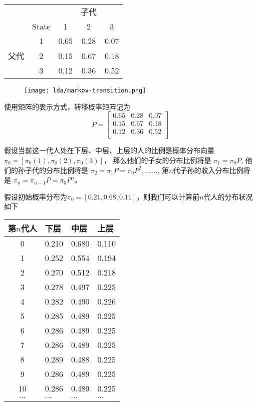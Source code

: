 \begin{center}
\begin{tabular}{ccccc}
\hline
& & & 子代 &  \\
& State & 1 & 2 & 3 \\
\hline
     &1 & 0.65 & 0.28 & 0.07 \\
父代 & 2 & 0.15 & 0.67 & 0.18 \\
     & 3 & 0.12 & 0.36 & 0.52 \\
\end{tabular}
\end{center}

\begin{figure}[htbp]
\centering
\texttt{[image: lda/markov-transition.png]}
\end{figure}

使用矩阵的表示方式，转移概率矩阵记为
$$P =
\begin{bmatrix}
0.65 & 0.28 & 0.07 \\
0.15 & 0.67 & 0.18 \\
0.12 & 0.36 & 0.52 \\
\end{bmatrix}
$$

假设当前这一代人处在下层、中层、上层的人的比例是概率分布向量 $\pi_0=[\pi_0(1), \pi_0(2), \pi_0(3)]$，
那么他们的子女的分布比例将是 $\pi_1=\pi_0P$, 他们的孙子代的分布比例将是 $\pi_2 = \pi_1P=\pi_0P^2$,
......, 第$n$代子孙的收入分布比例将是 $\pi_n = \pi_{n-1}P = \pi_0P^n$。

假设初始概率分布为$\pi_0 = [0.21,0.68,0.11] $，则我们可以计算前$n$代人的分布状况如下
\begin{center}
\begin{tabular}{clll}
第$n$代人 & 下层 & 中层 & 上层 \\
\hline
0 & 0.210 & 0.680 & 0.110 \\
1 & 0.252 & 0.554 & 0.194 \\
2 & 0.270 & 0.512 & 0.218 \\
3 & 0.278 & 0.497 & 0.225 \\
4 & 0.282 & 0.490 & 0.226 \\
5 & 0.285 & 0.489 & 0.225 \\
6 & 0.286 & 0.489 & 0.225 \\
7 & 0.286 & 0.489 & 0.225 \\
8 & 0.289 & 0.488 & 0.225 \\
9 & 0.286 & 0.489 & 0.225 \\
10 & 0.286 & 0.489 & 0.225 \\
$\cdots$  & $\cdots$  & $\cdots$  & $\cdots$  \\
\end{tabular}
\end{center}

